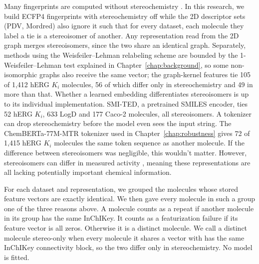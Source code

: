 Many fingerprints are computed without stereochemistry \citep{orsi2024map4c}. In this research, we build ECFP4 fingerprints with stereochemistry off while the 2D descriptor sets (PDV, Mordred) also ignore it such that for every dataset, each molecule they label a tie is a stereoisomer of another. Any representation read from the 2D graph merges stereoisomers, since the two share an identical graph. Separately, methods using the Weisfeiler--Lehman relabeling scheme are bounded by the 1-Weisfeiler--Lehman test explained in Chapter~\ref{chap:background}, so some non-isomorphic graphs also receive the same vector; the graph-kernel features tie 105 of 1,412 hERG $K_i$ molecules, 56 of which differ only in stereochemistry and 49 in more than that. Whether a learned embedding differentiates stereoisomers is up to its individual implementation. SMI-TED, a pretrained SMILES encoder, ties 52 hERG $K_i$, 633 LogD and 177 Caco-2 molecules, all stereoisomers. A tokenizer can drop stereochemistry before the model even sees the input string. The ChemBERTa-77M-MTR tokenizer used in Chapter~\ref{chap:robustness} gives 72 of 1,415 hERG $K_i$ molecules the same token sequence as another molecule. If the difference between stereoisomers was negligible, this wouldn't matter. However, stereoisomers can differ in measured activity \citep{Nguyen2006}, meaning these representations are all lacking potentially important chemical information.

For each dataset and representation, we grouped the molecules whose stored feature vectors are exactly identical. We then gave every molecule in such a group one of the three reasons above. A molecule counts as a repeat if another molecule in its group has the same InChIKey. It counts as a featurization failure if its feature vector is all zeros. Otherwise it is a distinct molecule. We call a distinct molecule stereo-only when every molecule it shares a vector with has the same InChIKey connectivity block, so the two differ only in stereochemistry. No model is fitted.

